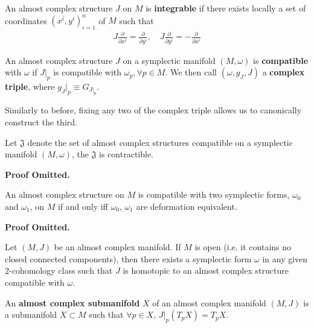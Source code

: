 \documentclass[11pt, final]{article}
\begin{document}
\begin{definition}
	An almost complex structure $J$ on $M$ is \textbf{integrable} if there exists locally a set of coordinates $(x^i,y^i)_{i=1}^n$ of $M$ such that
		\begin{align}
			J \frac{\partial}{\partial x^i} =  \frac{\partial}{\partial y^i}, \quad J \frac{\partial}{\partial y^i} = - \frac{\partial}{\partial x^i}
		\end{align}
\end{definition}

\begin{definition}
	An almost complex structure $J$ on a symplectic manifold $(M,\omega)$ is \textbf{compatible} with $\omega$ if $J|_p$ is compatible with $\omega_p, \forall p \in M$. We then call $(\omega, g_J, J)$ a \textbf{complex triple}, where $g_J|_p \equiv G_{J|_p}$. 
\end{definition}
\begin{remark}
	Similarly to before, fixing any two of the complex triple allows us to canonically construct the third.
\end{remark}

\begin{prop}
	Let $\mathfrak{J}$ denote the set of almost complex structures compatible on a symplectic manifold $(M,\omega)$, the $\mathfrak{J}$ is contractible.
\end{prop}
\textbf{Proof Omitted.}

\begin{prop}
	An almost complex structure on $M$ is compatible with two symplectic forms, $\omega_0$ and $\omega_1$, on $M$ if and only iff $\omega_0$, $\omega_1$ are deformation equivalent.
\end{prop}
\textbf{Proof Omitted.}

\begin{theorem}[Gromov]
	Let $(M,J)$ be an almost complex manifold. If $M$ is open (i.e. it contains no closed connected components), then there exists a symplectic form $\omega$ in any given $2$-cohomology class such that $J$ is homotopic to an almost complex structure compatible with $\omega$.
\end{theorem}

\begin{definition}
	An \textbf{almost complex submanifold} $X$ of an almost complex manifold $(M,J)$ is a submanifold $X \subset M$ such that $\forall p \in X$, $ J|_p  \left(T_pX\right) = T_pX$.
\end{definition}
\end{document}
